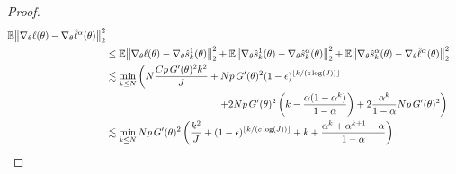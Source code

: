 \begin{proof}
\begin{align}
    \E\big\|\nabla_\theta\ell(\theta) - \nabla_\theta \hat\ell^\alpha(\theta)\big\|_2^2 
    \\
    &\leq \E\big\|\nabla_\theta\ell(\theta) - \nabla_\theta\hat s_k^1(\theta)\big\|_2^2 + \E\big\|\nabla_\theta\hat s_k^1(\theta) - \nabla_\theta\hat s_k^\alpha(\theta)\big\|_2^2 + \E\big\|\nabla_\theta\hat s_k^\alpha(\theta) -  \nabla_\theta\hat\ell^\alpha(\theta)\big\|_2^2 
    \\ \nonumber
    &\lesssim \min_{k \leq N} \left(N\frac{Cp \, G'(\theta)^2k^2}{J} + Np \, G'(\theta)^2(1-\epsilon)^{\floor{k/(c\log(J))}} \right.
    \\
    & \hspace{40mm} \left.
    + 2Np \, G'(\theta)^2\left(k-\frac{\alpha(1-\alpha^k)}{1-\alpha}\right) + 2\frac{\alpha^k}{1-\alpha}Np \, G'(\theta)^2\right) \\
    &\lesssim \min_{k \leq N} Np \, G'(\theta)^2\left(\frac{k^2}{J}+(1-\epsilon)^{\floor{k/(c\log(J))}}+k+\frac{\alpha^k  + \alpha^{k+1} - \alpha}{1-\alpha}\right).
\end{align}

\end{proof}

